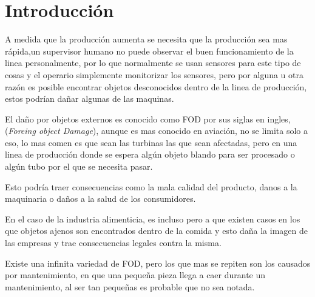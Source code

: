 \chapter{Introducción}\label{intro}



A medida que la producción aumenta se necesita que la producción sea mas rápida,un supervisor humano no puede observar el buen funcionamiento de la linea personalmente, por lo que normalmente se usan sensores para este tipo de cosas y el operario simplemente monitorizar los sensores, pero por alguna u otra razón es posible encontrar objetos desconocidos dentro de la linea de producción, estos podrían dañar algunas de las maquinas.

El daño por objetos externos es conocido como FOD  por sus siglas en ingles, (\textit{Foreing object Damage}), aunque es mas conocido en aviación, no se limita solo a eso, lo mas comen es que sean las turbinas las que sean afectadas, pero en una linea de producción donde se espera algún objeto blando para ser procesado o algún tubo por el que se necesita pasar.

Esto podría traer consecuencias como la mala calidad del producto, danos a la maquinaria o daños a la salud de los consumidores.

En el caso de la industria alimenticia, es incluso pero a que existen casos en los que objetos ajenos son encontrados dentro de la comida y esto daña la imagen de las empresas y trae consecuencias legales contra la misma.

Existe una infinita variedad de FOD, pero los que mas se repiten son los causados por mantenimiento, en que una pequeña pieza llega a caer durante un mantenimiento, al ser tan pequeñas es probable que no sea notada.


